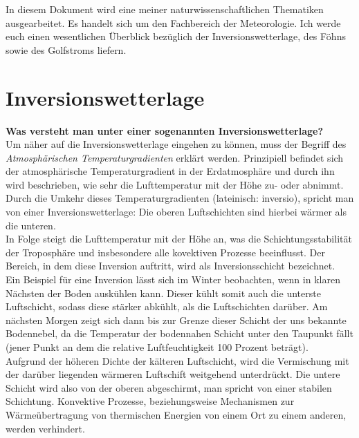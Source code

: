 \documentclass[11pt, a4paper]{article}
\begin{document}
In diesem Dokument wird eine meiner naturwissenschaftlichen Thematiken ausgearbeitet. Es handelt sich um den Fachbereich der Meteorologie. Ich werde euch einen wesentlichen Überblick bezüglich der Inversionswetterlage, des Föhns sowie des Golfstroms liefern.

\section{Inversionswetterlage}

\textbf{Was versteht man unter einer sogenannten Inversionswetterlage?}\\
Um näher auf die Inversionswetterlage eingehen zu können, muss der Begriff des \textit{Atmosphärischen Temperaturgradienten} erklärt werden. Prinzipiell befindet sich der atmosphärische Temperaturgradient in der Erdatmosphäre und durch ihn wird beschrieben, wie sehr die Lufttemperatur mit der Höhe zu- oder abnimmt. \\

Durch die Umkehr dieses Temperaturgradienten (lateinisch: inversio), spricht man von einer Inversionswetterlage: Die oberen Luftschichten sind hierbei wärmer als die unteren. \\

In Folge steigt die Lufttemperatur mit der Höhe an, was die Schichtungsstabilität der Troposphäre und insbesondere alle kovektiven Prozesse beeinflusst. Der Bereich, in dem diese Inversion auftritt, wird als Inversionsschicht bezeichnet.\\

Ein Beispiel für eine Inversion lässt sich im Winter beobachten, wenn in klaren Nächsten der Boden auskühlen kann. Dieser kühlt somit auch die unterste Luftschicht, sodass diese stärker abkühlt, als die Luftschichten darüber. Am nächsten Morgen zeigt sich dann bis zur Grenze dieser Schicht der uns bekannte Bodennebel, da die Temperatur der bodennahen Schicht unter den Taupunkt fällt (jener Punkt an dem die relative Luftfeuchtigkeit 100 Prozent beträgt). \\

Aufgrund der höheren Dichte der kälteren Luftschicht, wird die Vermischung mit der darüber liegenden wärmeren Luftschift weitgehend unterdrückt. Die untere Schicht wird also von der oberen abgeschirmt, man spricht von einer stabilen Schichtung. Konvektive Prozesse, beziehungsweise Mechanismen zur Wärmeübertragung von thermischen Energien von einem Ort zu einem anderen, werden verhindert. \\
\end{document}
